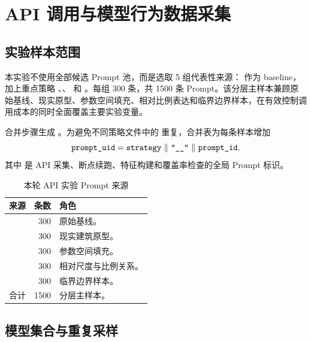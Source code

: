 \section{API 调用与模型行为数据采集}

\subsection{实验样本范围}

本实验不使用全部候选 Prompt 池，而是选取 5 组代表性来源： 作为 baseline，加上重点策略 、、 和 。每组 300 条，共 1500 条 Prompt。该分层主样本兼顾原始基线、现实原型、参数空间填充、相对比例表达和临界边界样本，在有效控制调用成本的同时全面覆盖主要实验变量。

合并步骤生成 。为避免不同策略文件中的  重复，合并表为每条样本增加
\begin{equation}
\mcode{prompt_uid}=\mcode{strategy}\ \Vert\ \mcode{"__"}\ \Vert\ \mcode{prompt_id}.
\end{equation}
其中  是 API 采集、断点续跑、特征构建和覆盖率检查的全局 Prompt 标识。

\begin{table}[t]
\centering
\caption{本轮 API 实验 Prompt 来源}
\label{tab:selected-prompts}
\small
\begin{tabularx}{\columnwidth}{p{}rY}
\toprule
来源 & 条数 & 角色 \\
\midrule
{} & 300 & 原始基线。\\
 & 300 & 现实建筑原型。\\
 & 300 & 参数空间填充。\\
 & 300 & 相对尺度与比例关系。\\
 & 300 & 临界边界样本。\\
\midrule
合计 & 1500 & 分层主样本。\\
\bottomrule
\end{tabularx}
\end{table}

\subsection{模型集合与重复采样}

